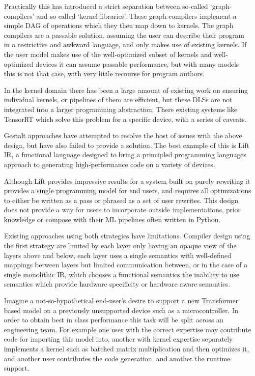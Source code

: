 Practically this has introduced a strict separation between so-called ‘graph-compilers’ and so called ‘kernel libraries’.
These graph compilers implement a simple DAG of operations which they then map down to kernels.
The graph compilers are a passable solution, assuming the user can describe their program in a restrictive and awkward language,
  and only makes use of existing kernels.
If the user model makes use of the well-optimized subset of kernels and well-optimized devices it can assume passable performance,
  but with many models this is not that case, with very little recourse for program authors.

In the kernel domain there has been a large amount of existing work on ensuring individual kernels, or pipelines of them are efficient,
  but these DLSs are not integrated into a larger programming abstraction.
There existing systems like TensorRT which solve this problem for a specific device, with a series of caveats.

Gestalt approaches have attempted to resolve the host of issues with the above design, but have also failed to provide a solution.
The best example of this is Lift IR, a functional language designed to bring a principled programming languages approach to generating
high-performance code on a variety of devices.

Although Lift provides impressive results for a system built on purely rewriting it provides a single programming model for end users,
  and requires all optimizations to either be written as a pass or phrased as a set of user rewrites.
This design does not provide a way for users to incorporate outside implementations,
  prior knowledge or compose with their ML pipelines often written in Python.

Existing approaches using both strategies have limitations.
Compiler design using the first strategy are limited by each layer only having an opaque view of the layers above and below,
each layer uses a single semantics with well-defined mappings between layers but limited communication between,
 or in the case of a single monolithic IR, which chooses a functional semantics the inability to use semantics which provide
 hardware specificity or hardware aware semantics.

Imagine a not-so-hypothetical end-user’s desire to support a new Transformer based model on a previously unsupported device such as a microcontroller.
In order to obtain best in class performance this task will be split across an engineering team.
For example one user with the correct expertise may contribute code for importing this model into, another with kernel expertise separately implements
a kernel such as batched matrix multiplication and then optimizes it, and another user contributes the code generation, and another the runtime support.


